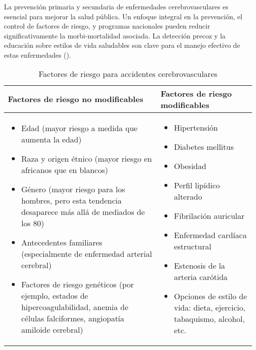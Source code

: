 La prevención primaria y secundaria de enfermedades cerebrovasculares es esencial para mejorar la salud pública. Un enfoque integral en la prevención, el control de factores de riesgo, y programas nacionales pueden reducir significativamente la morbi-mortalidad asociada. La detección precoz y la educación sobre estilos de vida saludables son clave para el manejo efectivo de estas enfermedades (\cite{incn2018}).
\begin{table}[h!]
    \centering
    \begin{tabular}{|p{}|p{}|}
        \hline
        \textbf{Factores de riesgo no modificables} & \textbf{Factores de riesgo modificables} \\
        \hline
        \begin{itemize}
            \item Edad (mayor riesgo a medida que aumenta la edad)
            \item Raza y origen étnico (mayor riesgo en africanos que en blancos)
            \item Género (mayor riesgo para los hombres, pero esta tendencia desaparece más allá de mediados de los 80)
            \item Antecedentes familiares (especialmente de enfermedad arterial cerebral)
            \item Factores de riesgo genéticos (por ejemplo, estados de hipercoagulabilidad, anemia de células falciformes, angiopatía amiloide cerebral)
        \end{itemize} &
        \begin{itemize}
            \item Hipertensión
            \item Diabetes mellitus
            \item Obesidad
            \item Perfil lipídico alterado
            \item Fibrilación auricular
            \item Enfermedad cardíaca estructural
            \item Estenosis de la arteria carótida
            \item Opciones de estilo de vida: dieta, ejercicio, tabaquismo, alcohol, etc.
        \end{itemize} \\
        \hline
    \end{tabular}
    \caption{Factores de riesgo para accidentes cerebrovasculares}
    \label{tab:risk_factors}
\end{table}



